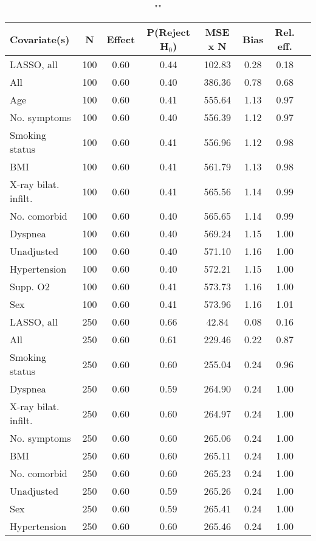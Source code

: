 \documentclass{article}
\begin{document}
{\tabcolsep=6pt  %
\begin{longtable}{lccccccc}
\caption{""} \\
Covariate(s) & N & Effect & P(Reject H$_0$) & MSE x N & Bias & Rel. eff.\\ \midrule
LASSO, all & 100 & 0.60 & 0.44 & 102.83 & 0.28 & 0.18 \\ 
All & 100 & 0.60 & 0.40 & 386.36 & 0.78 & 0.68 \\ 
Age & 100 & 0.60 & 0.41 & 555.64 & 1.13 & 0.97 \\ 
No. symptoms & 100 & 0.60 & 0.40 & 556.39 & 1.12 & 0.97 \\ 
Smoking status & 100 & 0.60 & 0.41 & 556.96 & 1.12 & 0.98 \\ 
BMI & 100 & 0.60 & 0.41 & 561.79 & 1.13 & 0.98 \\ 
X-ray bilat. infilt. & 100 & 0.60 & 0.41 & 565.56 & 1.14 & 0.99 \\ 
No. comorbid & 100 & 0.60 & 0.40 & 565.65 & 1.14 & 0.99 \\ 
Dyspnea & 100 & 0.60 & 0.40 & 569.24 & 1.15 & 1.00 \\ 
Unadjusted & 100 & 0.60 & 0.40 & 571.10 & 1.16 & 1.00 \\ 
Hypertension & 100 & 0.60 & 0.40 & 572.21 & 1.15 & 1.00 \\ 
Supp. O2 & 100 & 0.60 & 0.41 & 573.73 & 1.16 & 1.00 \\ 
Sex & 100 & 0.60 & 0.41 & 573.96 & 1.16 & 1.01 \\ \midrule 
LASSO, all & 250 & 0.60 & 0.66 &  42.84 & 0.08 & 0.16 \\ 
All & 250 & 0.60 & 0.61 & 229.46 & 0.22 & 0.87 \\ 
Smoking status & 250 & 0.60 & 0.60 & 255.04 & 0.24 & 0.96 \\ 
Dyspnea & 250 & 0.60 & 0.59 & 264.90 & 0.24 & 1.00 \\ 
X-ray bilat. infilt. & 250 & 0.60 & 0.60 & 264.97 & 0.24 & 1.00 \\ 
No. symptoms & 250 & 0.60 & 0.60 & 265.06 & 0.24 & 1.00 \\ 
BMI & 250 & 0.60 & 0.60 & 265.11 & 0.24 & 1.00 \\ 
No. comorbid & 250 & 0.60 & 0.60 & 265.23 & 0.24 & 1.00 \\ 
Unadjusted & 250 & 0.60 & 0.59 & 265.26 & 0.24 & 1.00 \\ 
Sex & 250 & 0.60 & 0.59 & 265.41 & 0.24 & 1.00 \\ 
Hypertension & 250 & 0.60 & 0.60 & 265.46 & 0.24 & 1.00 \\ 

\end{longtable}}
\end{document}

